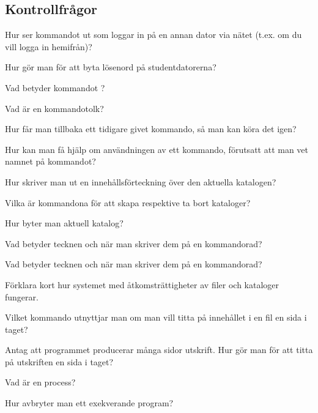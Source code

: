 \subsection*{Kontrollfrågor}
\begin{Kontrollfragor}
	\item Hur ser kommandot ut som loggar in på en annan dator via nätet (t.ex. om du vill logga in hemifrån)?
	\item Hur gör man för att byta lösenord på studentdatorerna?
	\item Vad betyder kommandot ?
	\item Vad är en kommandotolk?
	\item Hur får man tillbaka ett tidigare givet kommando, så man kan köra det igen?
	\item Hur kan man få hjälp om användningen av ett kommando, förutsatt att man vet namnet på kommandot?
	\item Hur skriver man ut en innehållsförteckning över den aktuella katalogen?
	\item Vilka är kommandona för att skapa respektive ta bort kataloger?
	\item Hur byter man aktuell katalog?
	\item Vad betyder tecknen  och \code{*} när man skriver dem på en kommandorad?
	\item Vad betyder tecknen \code{<} och \code{>} när man skriver dem på en kommandorad?
	\item Förklara kort hur systemet med åtkomsträttigheter av filer och kataloger fungerar.
	\item Vilket kommando utnyttjar man om man vill titta på innehållet i en fil en sida i taget?
	\item Antag att programmet  producerar många sidor utskrift. Hur gör man för att titta på utskriften en sida i taget?
	\item Vad är en process?
	\item Hur avbryter man ett exekverande program?
\end{Kontrollfragor}

\clearpage
